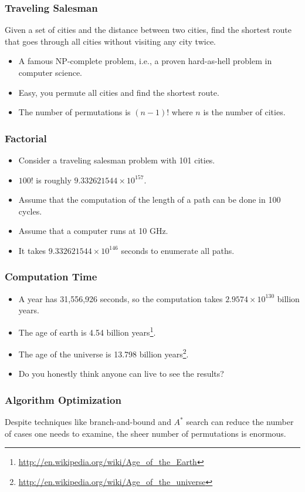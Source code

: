 \documentclass{beamer}
\begin{document}
\begin{CJK}{UTF8}{bsmi}
  \begin{frame}
    \frametitle{Traveling Salesman} Given a set of cities and the distance
    between two cities, find the shortest route that goes through all
    cities without visiting any city twice.
    \begin{itemize}
    \item A famous NP-complete problem, i.e., a proven hard-as-hell problem in computer science.
    \item Easy, you permute all cities and find the shortest route.
    \item The number of permutations is $(n-1)!$ where $n$ is the
      number of cities.
    \end{itemize}
  \end{frame}

  \begin{frame}
    \frametitle{Factorial}
    \begin{itemize}
    \item Consider a traveling salesman problem with 101 cities.
    \item $100!$ is roughly $9.332621544 \times 10^{157}$.
    \item Assume that the computation of the length of a path can be done
      in 100 cycles.
    \item Assume that a computer runs at 10 GHz.
    \item It takes $9.332621544 \times 10^{146}$ seconds to enumerate all
      paths.
    \end{itemize}
  \end{frame}

  \begin{frame}
    \frametitle{Computation Time}
    \begin{itemize}
    \item A year has 31,556,926 seconds, so the computation takes $2.9574
      \times 10^{130}$ billion years.
    \item The age of earth is 4.54 billion
      years\footnote{\url{http://en.wikipedia.org/wiki/Age_of_the_Earth}}.
    \item The age of the universe is 13.798 billion
      years\footnote{\url{http://en.wikipedia.org/wiki/Age_of_the_universe}}.
    \item Do you honestly think anyone can live to see the results?
    \end{itemize}
  \end{frame}

  \begin{frame}
    \frametitle{Algorithm Optimization} Despite techniques like
    branch-and-bound and $A^*$ search can reduce the number of cases one
    needs to examine, the sheer number of permutations is enormous.
  \end{frame}


\end{CJK}
\end{document}
